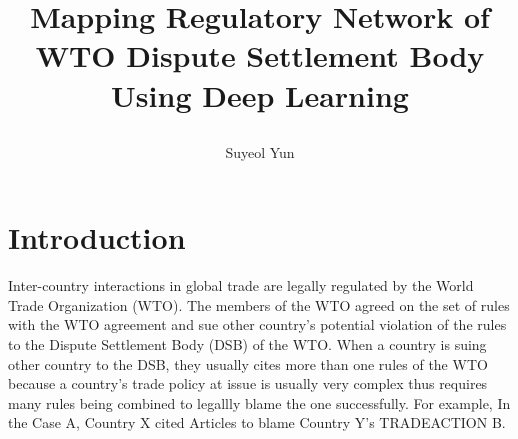 \documentclass[12pt,letterpaper]{article}
\newcommand{\tit}{
\bf 
Mapping Regulatory Network of WTO Dispute Settlement Body Using Deep Learning
}
\newcommand\spacingset[1]{\renewcommand{\baselinestretch}
{#1}\small\normalsize}
\begin{document}
\spacingset{1.25}

\setcounter{page}{0}
\vspace{-.1in}

{\title{
    \tit
  }
  \author{Suyeol Yun
  }
  \maketitle
}

\thispagestyle{empty}
\vspace{-.1in}

\begin{abstract}


\end{abstract}

\spacingset{1.5} %

\section{Introduction}



Inter-country interactions in global trade are legally regulated by the World Trade Organization (WTO).
The members of the WTO agreed on the set of rules with the WTO agreement and sue other country's potential
violation of the rules to the Dispute Settlement Body (DSB) of the WTO.
When a country is suing other country to the DSB, they usually cites more than one rules of the WTO
because a country's trade policy at issue is usually very complex thus requires many rules being combined to legallly blame the one successfully.
For example, In the Case A, Country X cited {Articles} to blame Country Y's TRADEACTION B.
\end{document}
